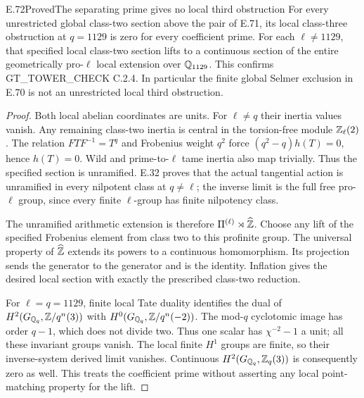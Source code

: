 \begin{result}{E.72}{Proved}{The separating prime gives no local third obstruction}
For every unrestricted global class-two section above the pair of
E.71, its local class-three obstruction at $q=1129$ is zero for
every coefficient prime. For each $\ell\ne1129$, that specified
local class-two section lifts to a continuous section of the
entire geometrically pro-$\ell$ local extension over $\mathbb Q_{1129}$.
This confirms GT\_TOWER\_CHECK C.2.4. In particular the finite
global Selmer exclusion in E.70 is not an unrestricted local
third obstruction.
\end{result}
\begin{proof}
Both local abelian coordinates are units. For $\ell\ne q$ their
inertia values vanish. Any remaining class-two inertia is central
in the torsion-free module $\mathbb Z_\ell(2)$. The relation
$FTF^{-1}=T^q$ and Frobenius weight $q^2$ force
$(q^2-q)h(T)=0$, hence $h(T)=0$. Wild and prime-to-$\ell$
tame inertia also map trivially. Thus the specified section is
unramified. E.32 proves that the actual tangential action is
unramified in every nilpotent class at $q\ne\ell$; the inverse
limit is the full free pro-$\ell$ group, since every finite
$\ell$-group has finite nilpotency class.

The unramified arithmetic extension is therefore
$\Pi^{(\ell)}\rtimes\widehat{\mathbb Z}$. Choose any lift of the specified
Frobenius element from class two to this profinite group. The
universal property of $\widehat{\mathbb Z}$ extends its powers to a
continuous homomorphism. Its projection sends the generator to
the generator and is the identity. Inflation gives the desired
local section with exactly the prescribed class-two reduction.

For $\ell=q=1129$, finite local Tate duality
\cite[Corollary~I.2.3, p.~28]{CohMilneADT} identifies the dual
of $H^2(G_{\mathbb Q_q},\mathbb Z/q^n(3))$ with
$H^0(G_{\mathbb Q_q},\mathbb Z/q^n(-2))$. The mod-$q$ cyclotomic image
has order $q-1$, which does not divide two. Thus one scalar has
$\chi^{-2}-1$ a unit; all these invariant groups vanish.
The local finite $H^1$ groups are finite, so their inverse-system
derived limit vanishes. Continuous $H^2(G_{\mathbb Q_q},\mathbb Z_q(3))$
is consequently zero as well. This treats the coefficient prime
without asserting any local point-matching property for the lift.
\end{proof}
